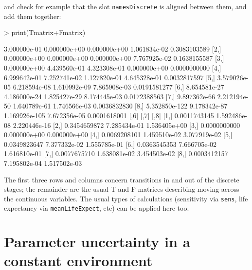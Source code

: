 \documentclass{article}
\begin{document}
and check for example that the slot {\tt namesDiscrete} is aligned between them, and add them together: 
\begin{Schunk}
\begin{Sinput}
> print(Tmatrix+Fmatrix)
\end{Sinput}
\begin{Soutput}
              [,1]         [,2]          [,3]         [,4]         [,5]
[1,]  3.000000e-01 0.000000e+00  0.000000e+00 1.061834e-02 0.3083103589
[2,]  0.000000e+00 0.000000e+00  0.000000e+00 7.767925e-02 0.1638155587
[3,]  0.000000e+00 4.439560e-01  4.323308e-01 0.000000e+00 0.0000000000
[4,]  6.999642e-01 7.252741e-02  1.127820e-01 4.645328e-01 0.0032817597
[5,]  3.579026e-05 6.218594e-08  1.610992e-09 7.865908e-03 0.0191581277
[6,]  8.654581e-27 4.186000e-24  1.825427e-29 8.174445e-03 0.0172388563
[7,]  9.897362e-66 2.212194e-50  1.640789e-61 1.746566e-03 0.0036832830
[8,] 5.352850e-122 9.178342e-87 1.169926e-105 7.672356e-05 0.0001618001
             [,6]         [,7]         [,8]
[1,] 0.0011743145 1.592486e-08 2.220446e-16
[2,] 0.3454659872 7.285434e-01 1.536405e+00
[3,] 0.0000000000 0.000000e+00 0.000000e+00
[4,] 0.0069208101 1.459510e-02 3.077919e-02
[5,] 0.0349823647 7.377332e-02 1.555785e-01
[6,] 0.0363545353 7.666705e-02 1.616810e-01
[7,] 0.0077675710 1.638081e-02 3.454503e-02
[8,] 0.0003412157 7.195802e-04 1.517502e-03
\end{Soutput}
\end{Schunk}
The first three rows and columns concern transitions in and out of the discrete stages; the remainder are the usual T and F matrices describing moving across the continuous variables. The usual types of calculations (sensitivity via {\tt sens}, life expectancy via {\tt meanLifeExpect}, etc) can be applied here too.    


\section{Parameter uncertainty in a constant environment}
\end{document}
